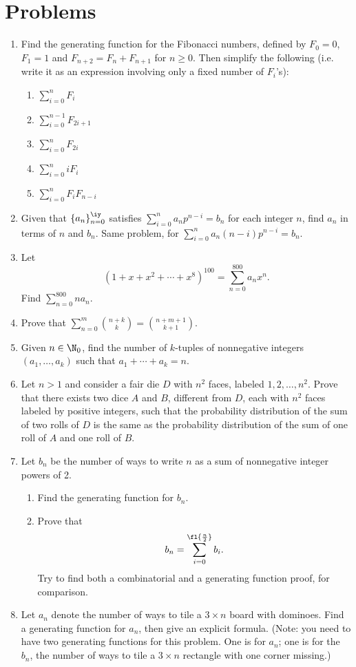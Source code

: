\section{Problems}
\begin{enumerate}
\item Find the generating function for the Fibonacci numbers, defined by $F_0=0$, $F_1=1$ and $F_{n+2}=F_n+F_{n+1}$ for $n\ge 0$. Then simplify the following (i.e. write it as an expression involving only a fixed number of $F_i$'s):
\begin{enumerate}
\item $\sum_{i=0}^n F_i$
\item $\sum_{i=0}^{n-1} F_{2i+1}$
\item $\sum_{i=0}^n F_{2i}$
\item $\sum_{i=0}^n iF_i$
\item $\sum_{i=0}^n F_iF_{n-i}$
\end{enumerate}
\item Given that $\{a_n\}_{n=0}^{\iy}$ satisfies $\sum_{i=0}^n a_np^{n-i}=b_n$ for each integer $n$, find $a_n$ in terms of $n$ and $b_n$. Same problem, for $\sum_{i=0}^n a_n(n-i)p^{n-i}=b_n$.
\item 
Let
\[
(1+x+x^2+\cdots +x^8)^{100}=\sum_{n=0}^{800} a_n x^n.
\]
Find $\sum_{n=0}^{800} na_n$.
\item Prove that $\sum_{n=0}^m \binom{n+k}{k}=\binom{n+m+1}{k+1}$.
\item Given $n\in\N_0$, find the number of $k$-tuples of nonnegative integers $(a_1,\ldots, a_k)$ such that $a_1+\cdots +a_k=n$.
\item Let $n>1$ and consider a fair die $D$ with $n^2$ faces, labeled $1,2,\ldots, n^2$. Prove that there exists two dice $A$ and $B$, different from $D$, each with $n^2$ faces labeled by positive integers, such that the probability distribution of the sum of two rolls of $D$ is the same as the probability distribution of the sum of one roll of $A$ and one roll of $B$.
\item Let $b_n$ be the number of ways to write $n$ as a sum of nonnegative integer powers of 2.
\begin{enumerate}
\item
Find the generating function for $b_n$.
\item
Prove that
\[
b_n=\sum_{i=0}^{\fl{\frac n2}} b_i.
\]
Try to find both a combinatorial and a generating function proof, for comparison.
\end{enumerate}
\item Let $a_n$ denote the number of ways to tile a $3\times n$ board with dominoes. Find a generating function for $a_n$, then give an explicit formula. (Note: you need to have two generating functions for this problem. One is for $a_n$; one is for the $b_n$, the number of ways to tile a $3\times n$ rectangle with one corner missing.)

\end{enumerate}
